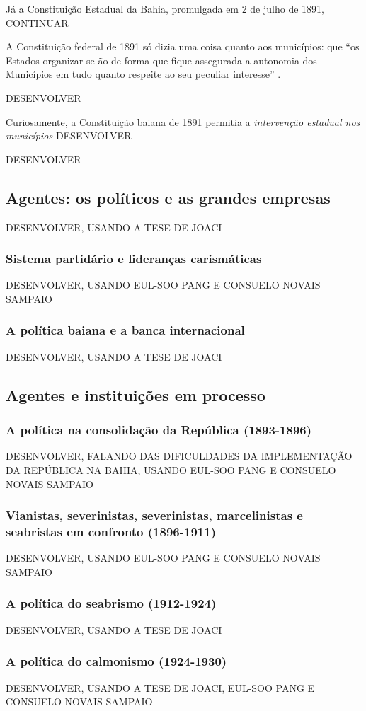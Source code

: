Já a Constituição Estadual da Bahia, promulgada em 2 de julho de 1891, CONTINUAR

A Constituição federal de 1891 só dizia uma coisa quanto aos municípios: que ``os Estados organizar-se-ão de forma que fique assegurada a autonomia dos Municípios em tudo quanto respeite ao seu peculiar interesse'' \cite[art.~68]{brasil_constituicao_1891}.

DESENVOLVER

Curiosamente, a Constituição baiana de 1891 permitia a \textit{intervenção estadual nos municípios} DESENVOLVER

DESENVOLVER

\subsection{Agentes: os políticos e as grandes empresas}

DESENVOLVER, USANDO A TESE DE JOACI

\subsubsection{Sistema partidário e lideranças carismáticas}

DESENVOLVER, USANDO EUL-SOO PANG E CONSUELO NOVAIS SAMPAIO

\subsubsection{A política baiana e a banca internacional}

DESENVOLVER, USANDO A TESE DE JOACI

\subsection{Agentes e instituições em processo}

\subsubsection{A política na consolidação da República (1893-1896)}

DESENVOLVER, FALANDO DAS DIFICULDADES DA IMPLEMENTAÇÃO DA REPÚBLICA NA BAHIA, USANDO EUL-SOO PANG E CONSUELO NOVAIS SAMPAIO

\subsubsection{Vianistas, severinistas, severinistas, marcelinistas e seabristas em confronto (1896-1911)}

DESENVOLVER, USANDO EUL-SOO PANG E CONSUELO NOVAIS SAMPAIO

\subsubsection{A política do seabrismo (1912-1924)}

DESENVOLVER, USANDO A TESE DE JOACI

\subsubsection{A política do calmonismo (1924-1930)}

DESENVOLVER, USANDO A TESE DE JOACI, EUL-SOO PANG E CONSUELO NOVAIS SAMPAIO